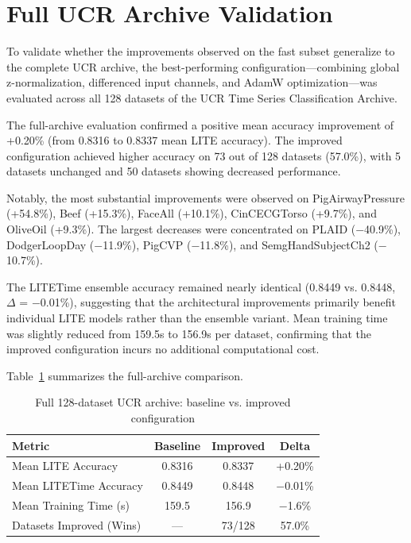 \documentclass[conference]{IEEEtran}
\begin{document}

\section{Full UCR Archive Validation}

To validate whether the improvements observed on the fast subset generalize to the complete UCR archive, the best-performing configuration---combining global z-normalization, differenced input channels, and AdamW optimization---was evaluated across all 128 datasets of the UCR Time Series Classification Archive.

The full-archive evaluation confirmed a positive mean accuracy improvement of +0.20\% (from 0.8316 to 0.8337 mean LITE accuracy). The improved configuration achieved higher accuracy on 73 out of 128 datasets (57.0\%), with 5 datasets unchanged and 50 datasets showing decreased performance.

Notably, the most substantial improvements were observed on PigAirwayPressure (+54.8\%), Beef (+15.3\%), FaceAll (+10.1\%), CinCECGTorso (+9.7\%), and OliveOil (+9.3\%). The largest decreases were concentrated on PLAID ($-$40.9\%), DodgerLoopDay ($-$11.9\%), PigCVP ($-$11.8\%), and SemgHandSubjectCh2 ($-$10.7\%).

The LITETime ensemble accuracy remained nearly identical (0.8449 vs. 0.8448, $\Delta$ = $-$0.01\%), suggesting that the architectural improvements primarily benefit individual LITE models rather than the ensemble variant. Mean training time was slightly reduced from 159.5s to 156.9s per dataset, confirming that the improved configuration incurs no additional computational cost.

Table~\ref{tab:full_ucr_summary} summarizes the full-archive comparison.

\begin{table}[h]
    \centering
    \caption{Full 128-dataset UCR archive: baseline vs. improved configuration}
    \label{tab:full_ucr_summary}
    \begin{tabular}{lccc}
        \toprule
        Metric                   & Baseline & Improved & Delta     \\
        \midrule
        Mean LITE Accuracy       & 0.8316   & 0.8337   & +0.20\%   \\
        Mean LITETime Accuracy   & 0.8449   & 0.8448   & $-$0.01\% \\
        Mean Training Time (s)   & 159.5    & 156.9    & $-$1.6\%  \\
        Datasets Improved (Wins) & ---      & 73/128   & 57.0\%    \\
        \bottomrule
    \end{tabular}
\end{table}
\end{document}
